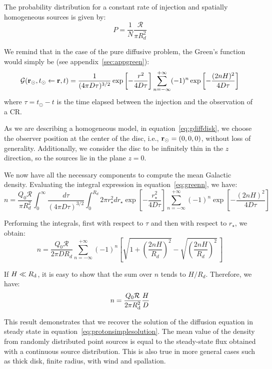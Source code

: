 The probability distribution for a constant rate of injection and spatially homogeneous sources is given by:
%
\begin{equation}
P = \frac{1}{N}\frac{\mathcal{R}}{\pi R_d^2}
\end{equation}

We remind that in the case of the pure diffusive problem, the Green's function would simply be (see appendix~\ref{sec:appgreen}):
%
\begin{equation}
\mathcal{G}(\vb r_\odot, t_\odot \leftarrow \vb r, t) = \frac{1}{(4\pi D \tau)^{3/2}} 
\exp \left[ -\frac{r^2}{4 D \tau} \right] 
\sum_{n=-\infty}^{+\infty} (-1)^n \exp \left[ -\frac{(2nH)^2}{4 D \tau} \right]
\label{eq:gdiffdisk}
\end{equation}
%
where $\tau = t_\odot - t$ is the time elapsed between the injection and the observation of a CR.

As we are describing a homogeneous model, in equation~\eqref{eq:gdiffdisk}, we choose the observer position at the center of the disc, i.e., $\vb r_\odot = (0,0,0)$, without loss of generality. Additionally, we consider the disc to be infinitely thin in the $z$ direction, so the sources lie in the plane $z = 0$.

We now have all the necessary components to compute the mean Galactic density. Evaluating the integral expression in equation~\eqref{eq:greenn}, we have:
%
\begin{equation}
n = \frac{Q_0 \mathcal R}{\pi R_d^2}
\int_0^{\infty} \!\! \frac{d\tau}{(4\pi D \tau)^{3/2}} \int_{0}^{R_d} 2 \pi r_\star^2 d r_\star
\exp \left[ -\frac{r_\star^2}{4 D \tau} \right]  
\sum_{n=-\infty}^{+\infty} (-1)^n \exp \left[ -\frac{(2nH)^2}{4 D \tau} \right]
\end{equation}

Performing the integrals, first with respect to $\tau$ and then with respect to $r_\star$, we obtain:
%
\begin{equation}
n = \frac{Q_0\mathcal R}{2\pi D R_d} \sum_{n=-\infty}^{+\infty} (-1)^n 
\left[ \sqrt{1 + \left(\frac{2 n H}{R_d}\right)^2} - \sqrt{\left(\frac{2 n H}{R_d}\right)^2} \, \right]
\end{equation}

If $H \ll R_{\rm d}$, it is easy to show that the sum over $n$ tends to $H/R_d$. Therefore, we have:
%
\begin{equation}
n =\frac{Q_0 \mathcal R}{2\pi R_{\rm d}^2}\frac{H}{D}
\end{equation}

This result demonstrates that we recover the solution of the diffusion equation in steady state in equation~\eqref{eq:protonsimplesolution}.
%
The mean value of the density from randomly distributed point sources is equal to the steady-state flux obtained with a continuous source distribution. This is also true in more general cases such as thick disk, finite radius, with wind and spallation.


